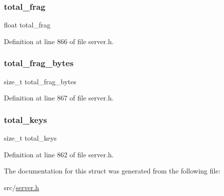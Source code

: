 \subsubsection{\texorpdfstring{total\+\_\+frag}{total\_frag}}
{\footnotesize\ttfamily float total\+\_\+frag}



Definition at line 866 of file server.\+h.

\mbox{\label{structredis_mem_overhead_a5e5705378e7ceb2bcfa33b637a7a6fd2}} 
\subsubsection{\texorpdfstring{total\+\_\+frag\+\_\+bytes}{total\_frag\_bytes}}
{\footnotesize\ttfamily size\+\_\+t total\+\_\+frag\+\_\+bytes}



Definition at line 867 of file server.\+h.

\mbox{\label{structredis_mem_overhead_ab0dd532666871698a3e8dc420ec74b28}} 
\subsubsection{\texorpdfstring{total\+\_\+keys}{total\_keys}}
{\footnotesize\ttfamily size\+\_\+t total\+\_\+keys}



Definition at line 862 of file server.\+h.



The documentation for this struct was generated from the following file\+:\begin{DoxyCompactItemize}
\item 
src/\hyperlink{server_8h}{server.\+h}\end{DoxyCompactItemize}
